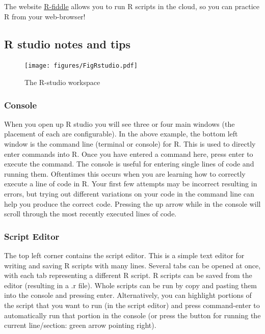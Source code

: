\documentclass[]{book}
\begin{document}
The website \href{http://www.r-fiddle.org}{R-fiddle} allows you to run R
scripts in the cloud, so you can practice R from your web-browser!

\subsection{R studio notes and tips}\label{r-studio-notes-and-tips}

\begin{figure}
\centering
\texttt{[image: figures/FigRstudio.pdf]}
\caption{\label{fig:2rstudiod}The R-studio workspace}
\end{figure}

\subsubsection{Console}\label{console}

When you open up R studio you will see three or four main windows (the
placement of each are configurable). In the above example, the bottom
left window is the command line (terminal or console) for R. This is
used to directly enter commands into R. Once you have entered a command
here, press enter to execute the command. The console is useful for
entering single lines of code and running them. Oftentimes this occurs
when you are learning how to correctly execute a line of code in R. Your
first few attempts may be incorrect resulting in errors, but trying out
different variations on your code in the command line can help you
produce the correct code. Pressing the up arrow while in the console
will scroll through the most recently executed lines of code.

\subsubsection{Script Editor}\label{script-editor}

The top left corner contains the script editor. This is a simple text
editor for writing and saving R scripts with many lines. Several tabs
can be opened at once, with each tab representing a different R script.
R scripts can be saved from the editor (resulting in a .r file). Whole
scripts can be run by copy and pasting them into the console and
pressing enter. Alternatively, you can highlight portions of the script
that you want to run (in the script editor) and press command-enter to
automatically run that portion in the console (or press the button for
running the current line/section: green arrow pointing right).
\end{document}
